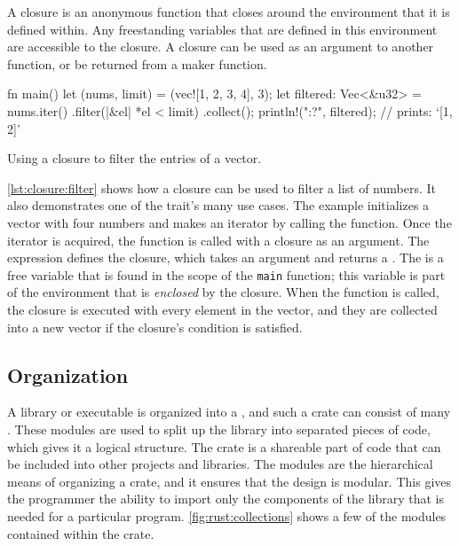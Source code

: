 A closure is an anonymous function that closes around the environment that it is defined within.
Any freestanding variables that are defined in this environment are accessible to the closure.
A closure can be used as an argument to another function, or be returned from a maker function.

\begin{listing}[H]
  \begin{rustcode}
fn main() {
  let (nums, limit) = (vec![1, 2, 3, 4], 3);
  let filtered: Vec<&u32> = nums.iter()
                                .filter(|&el| *el < limit)
                                .collect();
  println!("{:?}", filtered); // prints: `[1, 2]'
}
  \end{rustcode}
  \caption{Using a closure to filter the entries of a vector.}
  \label{lst:closure:filter}
\end{listing}

\autoref{lst:closure:filter} shows how a closure can be used to filter a list of numbers.
It also demonstrates one of the  trait's many use cases.
The example initializes a vector with four numbers and makes an iterator by calling the  function.
Once the iterator is acquired, the  function is called with a closure as an argument.
The expression  defines the closure, which takes an argument  and returns a .
The  is a free variable that is found in the scope of the \texttt{main} function; this variable is part of the environment that is \emph{enclosed} by the closure.
When the  function is called, the closure is executed with every element in the vector, and they are collected into a new vector if the closure's condition is satisfied.


\subsection{Organization}
\label{ssub:rust:organization}

A {\rust} library or executable is organized into a , and such a crate can consist of many .
These modules are used to split up the library into separated pieces of code, which gives it a logical structure.
The crate is a shareable part of {\rust} code that can be included into other projects and libraries.
The modules are the hierarchical means of organizing a crate, and it ensures that the design is modular.
This gives the programmer the ability to import only the components of the library that is needed for a particular program.
\autoref{fig:rust:collections} shows a few of the modules contained within the {\rust}  crate.

